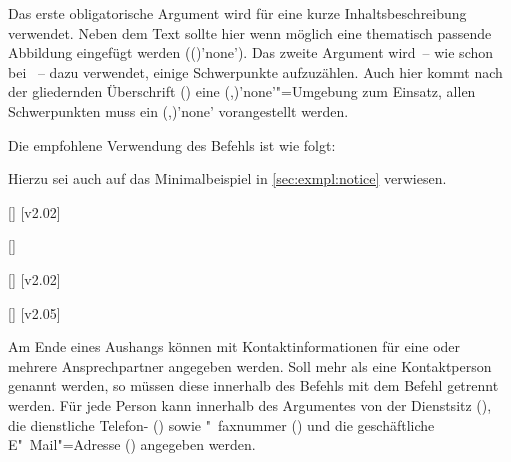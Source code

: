 \begin{DeclareEntity}{}
\begin{Declaration}
Das erste obligatorische Argument wird für eine kurze Inhaltsbeschreibung 
verwendet. Neben dem Text sollte hier wenn möglich eine thematisch passende 
Abbildung eingefügt werden (()'none'). 
Das zweite Argument wird~-- wie schon bei ~-- dazu verwendet, 
einige Schwerpunkte aufzuzählen. Auch hier kommt nach der gliedernden 
Überschrift () eine 
(,)'none'"=Umgebung
zum Einsatz, allen Schwerpunkten muss ein 
(,)'none' vorangestellt 
werden.
\end{Declaration}
%
\begin{Example}
Die empfohlene Verwendung des Befehls  ist wie folgt:
\begin{Code}
\end{Code}
Hierzu sei auch auf das Minimalbeispiel in \autoref{sec:exmpl:notice} verwiesen.
%
\end{Example}

\begin{Declaration}
  {[]}
  [v2.02]
\begin{Declaration}
  {[]}
\begin{Declaration}
  {[]}
  [v2.02]
\begin{Declaration}
  {[]}
  [v2.05]
\printdeclarationlist

Am Ende eines Aushangs können mit  Kontaktinformationen 
für eine oder mehrere Ansprechpartner angegeben werden. Soll mehr als eine 
Kontaktperson genannt werden, so müssen diese innerhalb des Befehls
 mit dem Befehl  getrennt werden. Für jede 
Person kann innerhalb des Argumentes von  der Dienstsitz 
(), die dienstliche Telefon- () sowie "~faxnummer
() und die geschäftliche E"~Mail"=Adresse () 
angegeben werden.
\end{Declaration}
\end{Declaration}
\end{Declaration}
\end{Declaration}




\end{DeclareEntity}
